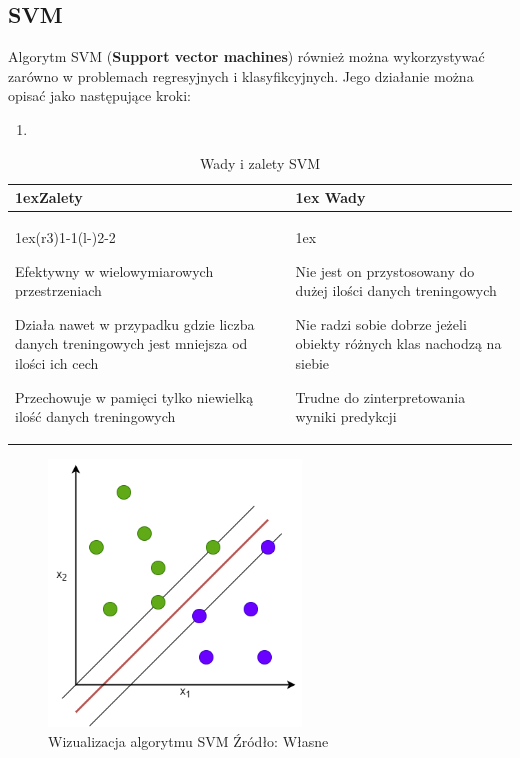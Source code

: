 \subsection{SVM}

Algorytm SVM (\textbf{Support vector machines}) również można wykorzystywać zarówno 
w problemach regresyjnych i klasyfikcyjnych. Jego działanie można opisać jako następujące
kroki:

\begin{enumerate}
    \item 
\end{enumerate}

\begin{table}[h]
    \begin{tabularx}{\linewidth}{>{\parskip1ex}X@{\kern4\tabcolsep}>{\parskip1ex}X}
    \toprule
    \hfil\bfseries Zalety
    &
    \hfil\bfseries Wady
    \\\cmidrule(r{3\tabcolsep}){1-1}\cmidrule(l{-\tabcolsep}){2-2}
    
    Efektywny w wielowymiarowych przestrzeniach\par
    Działa nawet w przypadku gdzie liczba danych treningowych jest mniejsza od
    ilości ich cech\par
    Przechowuje w pamięci tylko niewielką ilość danych treningowych\par
    
    &
    
    Nie jest on przystosowany do dużej ilości danych treningowych\par
    Nie radzi sobie dobrze jeżeli obiekty różnych klas nachodzą na siebie\par
    Trudne do zinterpretowania wyniki predykcji
    
    \\\bottomrule
    \end{tabularx}
    \caption{Wady i zalety SVM}
\end{table}

\begin{figure}[h]
    \centering
    \includegraphics[width=0.6\textwidth]{./Img/SVM.png}
    \caption{Wizualizacja algorytmu SVM Źródło: Własne}
\end{figure}

